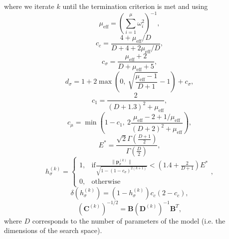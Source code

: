 \noindent where we iterate $k$ until the termination criterion is met and using
\begin{equation}
\mu_{\mathrm{eff}}=\left(\sum_{i=1}^\mu\omega_i^2\right)^{-1},
\end{equation}
\begin{equation}
c_c=\frac{4+\mu_{\mathrm{eff}}/D}{D+4+2\mu_{\mathrm{eff}}/D},
\end{equation}
\begin{equation}
c_\sigma=\frac{\mu_{\mathrm{eff}}+2}{D+\mu_{\mathrm{eff}}+5},
\end{equation}
\begin{equation}
d_\sigma=1+2\max\left(0,\ \sqrt{\frac{\mu_{\mathrm{eff}}-1}{D+1}}-1\right)+c_\sigma,
\end{equation}
\begin{equation}
c_1=\frac{2}{(D+1.3)^2+\mu_{\mathrm{eff}}},
\end{equation}
\begin{equation}
c_\mu=\min\left(1-c_1,\ 2\frac{\mu_{\mathrm{eff}}-2+1/\mu_{\mathrm{eff}}}{(D+2)^2+\mu_{\mathrm{eff}}}\right),
\end{equation}
\begin{equation}
E^*=\frac{\sqrt{2}\Gamma\left(\frac{D+1}{2}\right)}{\Gamma\left(\frac{D}{2}\right)},
\end{equation}
\begin{equation}h_\sigma^{(k)}=
\begin{cases} 
      1, & \mathrm{if} \frac{\|\mathbf{p}^{(k)}_\sigma\|}{\sqrt{1-\left(1-c_\sigma\right)^{2(k+1)}}}<\left(1.4+\frac{2}{D+1}\right)E^*\\
      0, & \mathrm{otherwise}
   \end{cases},
\end{equation}
\begin{equation}
\delta\left(h_\sigma^{(k)}\right)=\left(1-h_\sigma^{(k)}\right)c_c\left(2-c_c\right),
\end{equation}
\begin{equation}
\left(\mathbf{C}^{(k)}\right)^{-1/2}=\mathbf{B}\left(\mathbf{D}^{(k)}\right)^{-1}\mathbf{B}^T,
\end{equation}
\noindent where $D$ corresponds to the number of parameters of the model (i.e. the dimensions of the search space).












